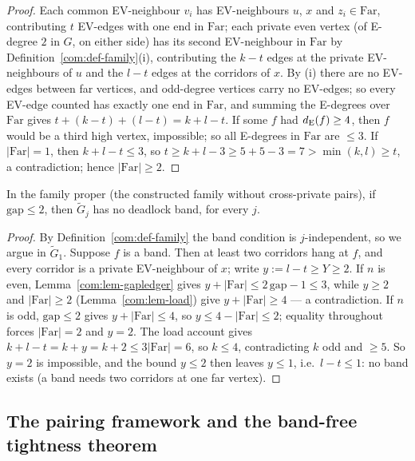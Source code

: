 \begin{proof}
Each common EV-neighbour $v_i$ has EV-neighbours $u$, $x$ and
$z_i\in\mathrm{Far}$, contributing $t$ EV-edges with one end in
$\mathrm{Far}$; each private even vertex (of E-degree $2$ in $G$, on
either side) has its second EV-neighbour in $\mathrm{Far}$ by
Definition~\ref{com:def-family}(i), contributing the $k-t$ edges at the
private EV-neighbours of $u$ and the $l-t$ edges at the corridors of $x$.
By (i) there are no EV-edges between far vertices, and odd-degree
vertices carry no EV-edges; so every EV-edge counted has exactly one end
in $\mathrm{Far}$, and summing the E-degrees over $\mathrm{Far}$ gives
$t+(k-t)+(l-t)=k+l-t$. If some $f$ had $d_{\mathrm{E}}(f)\ge4$, then $f$ would be a
third high vertex, impossible; so all E-degrees in $\mathrm{Far}$ are
$\le3$. If $|\mathrm{Far}|=1$, then $k+l-t\le3$, so
$t\ge k+l-3\ge5+5-3=7>\min(k,l)\ge t$, a contradiction; hence
$|\mathrm{Far}|\ge2$.
\end{proof}

\begin{proposition}
\label{com:prop-gapnoband}
In the family proper (the constructed family without cross-private
pairs), if $\mathrm{gap}\le2$, then $\tilde G_j$ has no deadlock band,
for every $j$.
\end{proposition}

\begin{proof}
By Definition~\ref{com:def-family} the band condition is
$j$-independent, so we argue in $\tilde G_1$. Suppose $f$ is a band. Then
at least two corridors hang at $f$, and every corridor is a private
EV-neighbour of $x$; write $y:=l-t\ge Y\ge2$.
If $n$ is even, Lemma~\ref{com:lem-gapledger} gives
$y+|\mathrm{Far}|\le 2\,\mathrm{gap}-1\le3$, while $y\ge2$ and
$|\mathrm{Far}|\ge2$ (Lemma~\ref{com:lem-load}) give
$y+|\mathrm{Far}|\ge4$ --- a contradiction. If $n$ is odd,
$\mathrm{gap}\le2$ gives $y+|\mathrm{Far}|\le4$, so
$y\le4-|\mathrm{Far}|\le2$; equality throughout forces $|\mathrm{Far}|=2$
and $y=2$. The load account gives $k+l-t=k+y=k+2\le3|\mathrm{Far}|=6$, so
$k\le4$, contradicting $k$ odd and $\ge5$. So $y=2$ is impossible, and
the bound $y\le2$ then leaves $y\le1$, i.e.\ $l-t\le1$: no band exists (a
band needs two corridors at one far vertex).
\end{proof}

\subsection{The pairing framework and the band-free tightness theorem}

